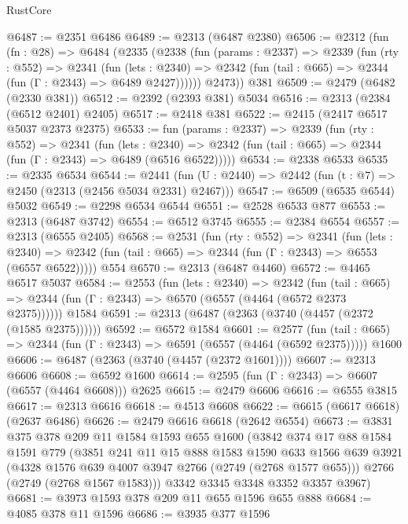 \begin{lexlean}{RustCore}
\begin{coremodule}
@6487 := @2351 @6486
@6489 := @2313 (@6487 @2380)
@6506 := @2312
    (fun (fn : @28) =>
    @6484
      (@2335
        (@2338
          (fun (params : @2337) =>
          @2339
            (fun (rty : @552) =>
            @2341
              (fun (lets : @2340) =>
              @2342 (fun (tail : @665) => @2344 (fun (Γ : @2343) => @6489 @2427))))))
        @2473))
    @381
@6509 := @2479 (@6482 (@2330 @381))
@6512 := @2392 (@2393 @381) @5034
@6516 := @2313 (@2384 (@6512 @2401) @2405)
@6517 := @2418 @381
@6522 := @2415 (@2417 @6517 @5037 @2373 @2375)
@6533 := fun (params : @2337) =>
  @2339
    (fun (rty : @552) =>
    @2341
      (fun (lets : @2340) =>
      @2342 (fun (tail : @665) => @2344 (fun (Γ : @2343) => @6489 (@6516 @6522)))))
@6534 := @2338 @6533
@6535 := @2335 @6534
@6544 := @2441 (fun (U : @2440) => @2442 (fun (t : @7) => @2450 (@2313 (@2456 @5034 @2331) @2467)))
@6547 := @6509 (@6535 @6544) @5032
@6549 := @2298 @6534 @6544
@6551 := @2528 @6533 @877
@6553 := @2313 (@6487 @3742)
@6554 := @6512 @3745
@6555 := @2384 @6554
@6557 := @2313 (@6555 @2405)
@6568 := @2531
    (fun (rty : @552) =>
    @2341
      (fun (lets : @2340) =>
      @2342 (fun (tail : @665) => @2344 (fun (Γ : @2343) => @6553 (@6557 @6522)))))
    @554
@6570 := @2313 (@6487 @4460)
@6572 := @4465 @6517 @5037
@6584 := @2553
    (fun (lets : @2340) =>
    @2342
      (fun (tail : @665) => @2344 (fun (Γ : @2343) => @6570 (@6557 (@4464 (@6572 @2373 @2375))))))
    @1584
@6591 := @2313 (@6487 (@2363 (@3740 (@4457 (@2372 (@1585 @2375))))))
@6592 := @6572 @1584
@6601 := @2577
    (fun (tail : @665) => @2344 (fun (Γ : @2343) => @6591 (@6557 (@4464 (@6592 @2375)))))
    @1600
@6606 := @6487 (@2363 (@3740 (@4457 (@2372 @1601))))
@6607 := @2313 @6606
@6608 := @6592 @1600
@6614 := @2595 (fun (Γ : @2343) => @6607 (@6557 (@4464 @6608))) @2625
@6615 := @2479 @6606
@6616 := @6555 @3815
@6617 := @2313 @6616
@6618 := @4513 @6608
@6622 := @6615 (@6617 @6618) (@2637 @6486)
@6626 := @2479 @6616 @6618 (@2642 @6554)
@6673 := @3831
    @375
    @378
    @209
    @11
    @1584
    @1593
    @655
    @1600
    (@3842
      @374
      @17
      @88
      @1584
      @1591
      @779
      (@3851
        @241
        @11
        @15
        @888
        @1583
        @1590
        @633
        @1566
        @639
        @3921
        (@4328 @1576 @639 @4007 @3947 @2766 (@2749 (@2768 @1577 @655)))
        @2766
        (@2749 (@2768 @1567 @1583)))
      @3342
      @3345
      @3348
      @3352
      @3357
      @3967)
@6681 := @3973 @1593 @378 @209 @11 @655 @1596 @655 @888
@6684 := @4085 @378 @11 @1596
@6686 := @3935 @377 @1596

\end{coremodule}
\end{lexlean}
